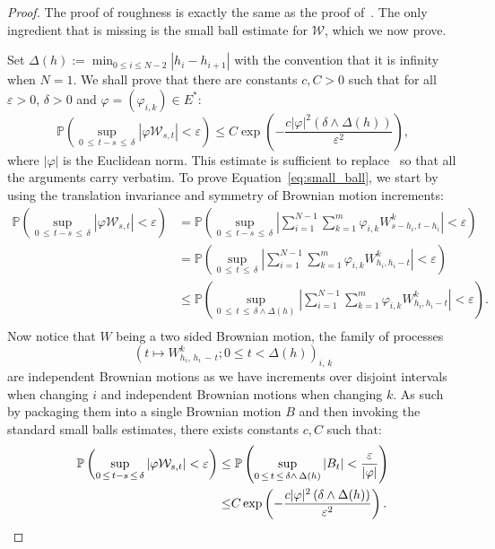 \documentclass[11pt]{article}
\theoremstyle{definition}
\numberwithin{equation}{section}
\numberwithin{figure}{section}
\numberwithin{table}{section}
\newcommand{\Pbb}{\mathbb{P}}%
\newcommand*\Wc{\mathcal{W}}
\begin{document}
\begin{proof}
The proof of roughness is exactly the same as the proof of~\cite[Proposition~6.11]{FH14}. The only ingredient that is missing is the small ball estimate for $\Wc$, which we now prove.

Set $\Delta(h):= \min_{0 \leq i \leq N-2} \left|h_i - h_{i+1}\right|$ with the convention that it is infinity when $N=1$. We shall prove that there are constants $c, C > 0$ such that for all $\varepsilon>0$, $\delta>0$ and $\varphi = \left(\varphi_{i,k} \right) \in E^*$:
\begin{equation}\label{eq:small_ball}
\Pbb\left(\sup_{0\,\leq\,t-s\,\leq\,\delta} \left| \varphi \Wc_{s,t} \right| < \varepsilon \right)
\leq C \exp\left(-\frac{c |\varphi|^2 \left(\delta \wedge \Delta(h) \right) }{\varepsilon^2} \right),
\end{equation}
where $|\varphi|$ is the Euclidean norm. This estimate is sufficient to replace~\cite[Equation~(6.11) p.~91]{FH14} so that all the arguments carry verbatim. To prove Equation~\eqref{eq:small_ball}, we start by using the translation invariance and symmetry of Brownian motion increments:
\begin{align*}
\Pbb\left(\sup_{0\,\leq\,t-s\,\leq\,\delta} \left| \varphi \Wc_{s,t} \right| < \varepsilon \right)
& = \Pbb\left(\sup_{0\,\leq\,t-s\,\leq\,\delta}
\left| \sum_{i=1}^{N-1} \sum_{k=1}^m \varphi_{i,k} W_{s-h_i, t-h_i}^k\right| < \varepsilon \right)\\
& =\Pbb\left(\sup_{0\,\leq\,t\,\leq\,\delta}
\left| \sum_{i=1}^{N-1} \sum_{k=1}^m \varphi_{i,k} W_{h_i, h_i-t}^k\right| < \varepsilon \right)\\
& \leq\Pbb\left(\sup_{0\,\leq\,t\,\leq\,\delta \wedge \Delta(h)}
\left| \sum_{i=1}^{N-1} \sum_{k=1}^m \varphi_{i,k} W_{h_i, h_i-t}^k\right| < \varepsilon \right).\\
\end{align*}
Now notice that $W$ being a two sided Brownian motion, the family of processes
\[
\left(t \mapsto W_{h_i,\,h_i\,-\,t}^k ; 0 \leq t <\Delta(h) \right)_{i,\,k}
\]
are independent Brownian motions as we have increments over disjoint intervals when changing $i$ and independent Brownian motions when changing $k$. As such by packaging them into a single Brownian motion $B$ and then invoking the standard small balls estimates, there exists constants $c, C$ such that:
\begin{align*}
\Pbb\left(\sup_{0\,\leq\,t-s\,\leq\,\delta} \left| \varphi \Wc_{s,t} \right| < \varepsilon \right)
\leq &\;\Pbb\left(\sup_{0\,\leq\,t\,\leq\,\delta \wedge\,\Delta(h)}
\left| B_t \right| < \frac{\varepsilon}{|\varphi|}\right) \\
\leq & C \exp\left(-\frac{c |\varphi|^2 \left(\delta \wedge \Delta(h) \right) }{\varepsilon^2} \right) .\qedhere
\end{align*}
\end{proof}
\end{document}
